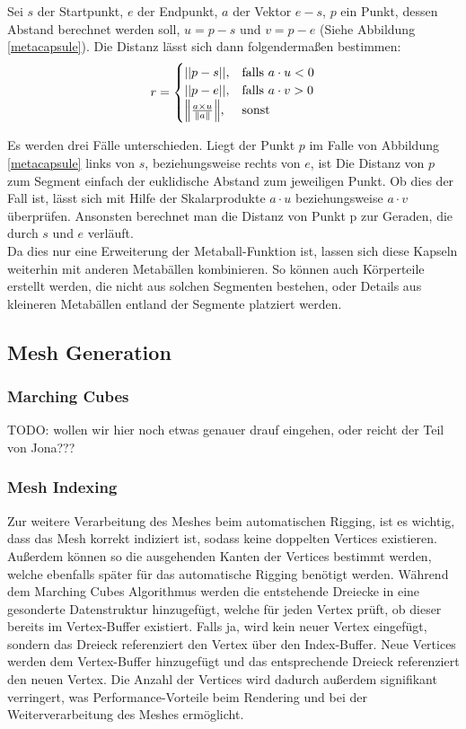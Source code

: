 Sei $s$ der Startpunkt, $e$ der Endpunkt, $a$ der Vektor $e-s$, $p$ ein Punkt, dessen Abstand berechnet werden soll, $u=p-s$ und $v=p-e$ (Siehe Abbildung \ref{metacapsule}). Die Distanz lässt sich dann folgendermaßen bestimmen:
\[
    r= 
\begin{cases}
    ||p-s||,& \text{falls } a\cdot u < 0\\
    ||p-e||,& \text{falls } a\cdot v > 0\\
    \norm*{\frac{a\times u}{\norm{a}}},& \text{sonst}
\end{cases}
\]

Es werden drei Fälle unterschieden. Liegt der Punkt $p$ im Falle von Abbildung \ref{metacapsule} links von $s$, beziehungsweise rechts von $e$, ist Die Distanz von $p$ zum Segment einfach der euklidische Abstand zum jeweiligen Punkt. Ob dies der Fall ist, lässt sich mit Hilfe der Skalarprodukte $a\cdot u$ beziehungsweise $a\cdot v$ überprüfen. Ansonsten berechnet man die Distanz von Punkt p zur Geraden, die durch $s$ und $e$ verläuft.\\

Da dies nur eine Erweiterung der Metaball-Funktion ist, lassen sich diese Kapseln weiterhin mit anderen Metabällen kombinieren. So können auch Körperteile erstellt werden, die nicht aus solchen Segmenten bestehen, oder Details aus kleineren Metabällen entland der Segmente platziert werden.



\subsection{Mesh Generation}

\subsubsection{Marching Cubes}
TODO: wollen wir hier noch etwas genauer drauf eingehen, oder reicht der Teil von Jona???

\subsubsection{Mesh Indexing}
Zur weitere Verarbeitung des Meshes beim automatischen Rigging, ist es wichtig, dass das Mesh korrekt indiziert ist, sodass keine doppelten Vertices existieren. Außerdem können so die ausgehenden Kanten der Vertices bestimmt werden, welche ebenfalls später für das automatische Rigging benötigt werden. Während dem Marching Cubes Algorithmus werden die entstehende Dreiecke in eine gesonderte Datenstruktur hinzugefügt, welche für jeden Vertex prüft, ob dieser bereits im Vertex-Buffer existiert. Falls ja, wird kein neuer Vertex eingefügt, sondern das Dreieck referenziert den Vertex über den Index-Buffer. Neue Vertices werden dem Vertex-Buffer hinzugefügt und das entsprechende Dreieck referenziert den neuen Vertex. Die Anzahl der Vertices wird dadurch außerdem signifikant verringert, was Performance-Vorteile beim Rendering und bei der Weiterverarbeitung des Meshes ermöglicht.

